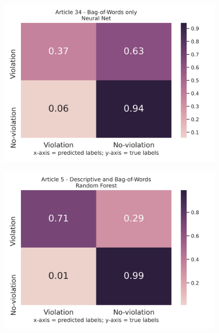 \documentclass{article}
\begin{document}
\begin{figure}[!htb]
	\centering
    \includegraphics[scale=0.5]{data/analysis/cm/binary_cm_normalized_test_article_34.png}  
\end{figure}
\begin{figure}[!htb]
	\centering
    \includegraphics[scale=0.5]{data/analysis/cm/binary_cm_normalized_test_article_5.png}  
\end{figure}
\end{document}
